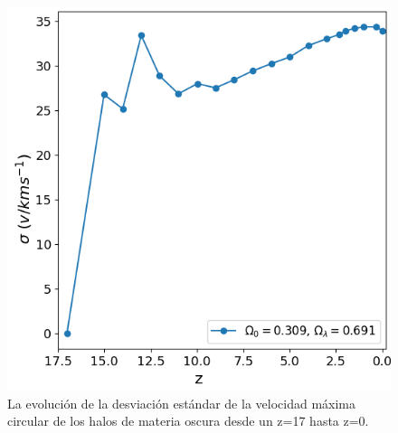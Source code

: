 \documentclass{beamer}
\begin{document}
\begin{frame}
\begin{columns}[t]
			\begin{column}{.5\textwidth}
				\begin{figure}
					\centering
					\includegraphics[scale=0.3]{RunCanonica/VelMax_Std_RunCanonica.png}
					\caption{\footnotesize La evolución de la desviación estándar de la velocidad máxima circular de los halos de materia oscura desde un z=17 hasta z=0.}
					\label{fig:Canon-VelMaxStd}
				\end{figure}
			\end{column}
		\end{columns}

	\end{frame}	

\end{document}
